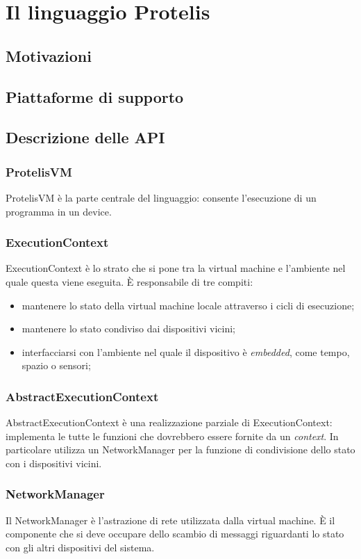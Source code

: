 \section{Il linguaggio Protelis}
\subsection{Motivazioni}

\subsection{Piattaforme di supporto}

\subsection{Descrizione delle API}

\subsubsection{ProtelisVM}

ProtelisVM è la parte centrale del linguaggio: consente l'esecuzione di un programma in un device.

\subsubsection{ExecutionContext}
\label{sec:ExecutionContext}
ExecutionContext è lo strato che si pone tra la virtual machine e l'ambiente nel quale questa viene eseguita. È responsabile di tre compiti:

\begin{itemize}
    \item{mantenere lo stato della virtual machine locale attraverso i cicli di esecuzione;}

    \item{mantenere lo stato condiviso dai dispositivi vicini;}

    \item{interfacciarsi con l'ambiente nel quale il dispositivo è \textit{embedded}, come tempo, spazio o sensori;}
\end{itemize}

\subsubsection{AbstractExecutionContext}

AbstractExecutionContext è una realizzazione parziale di ExecutionContext: implementa le tutte le funzioni che dovrebbero essere fornite da un \textit{context}. In particolare utilizza un NetworkManager per la funzione di condivisione dello stato con i dispositivi vicini.

\subsubsection{NetworkManager}

Il NetworkManager è l'astrazione di rete utilizzata dalla virtual machine. È il componente che si deve occupare dello scambio di messaggi riguardanti lo stato con gli altri dispositivi del sistema.